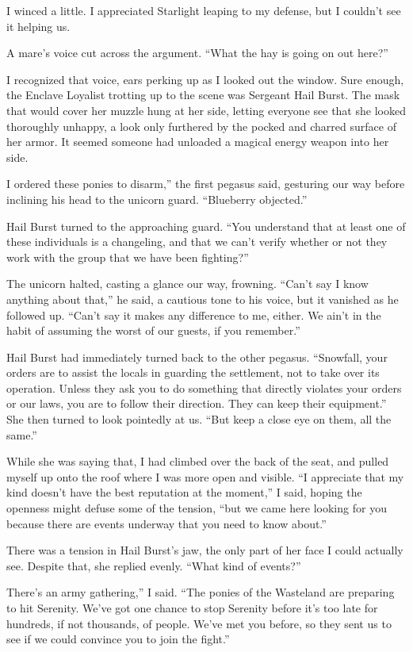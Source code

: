 I winced a little. I appreciated Starlight leaping to my defense, but I couldn’t see it helping us.

A mare’s voice cut across the argument. “What the hay is going on out here?”

I recognized that voice, ears perking up as I looked out the window. Sure enough, the Enclave Loyalist trotting up to the scene was Sergeant Hail Burst. The mask that would cover her muzzle hung at her side, letting everyone see that she looked thoroughly unhappy, a look only furthered by the pocked and charred surface of her armor. It seemed someone had unloaded a magical energy weapon into her side.

\leavevmode{}I ordered these ponies to disarm,” the first pegasus said, gesturing our way before inclining his head to the unicorn guard. “Blueberry objected.”

Hail Burst turned to the approaching guard. “You understand that at least one of these individuals is a changeling, and that we can’t verify whether or not they work with the group that we have been fighting?”

The unicorn halted, casting a glance our way, frowning. “Can’t say I know anything about that,” he said, a cautious tone to his voice, but it vanished as he followed up. “Can’t say it makes any difference to me, either. We ain’t in the habit of assuming the worst of our guests, if you remember.”

Hail Burst had immediately turned back to the other pegasus. “Snowfall, your orders are to assist the locals in guarding the settlement, not to take over its operation. Unless they ask you to do something that directly violates your orders or our laws, you are to follow their direction. They can keep their equipment.” She then turned to look pointedly at us. “But keep a close eye on them, all the same.”

While she was saying that, I had climbed over the back of the seat, and pulled myself up onto the roof where I was more open and visible. “I appreciate that my kind doesn’t have the best reputation at the moment,” I said, hoping the openness might defuse some of the tension, “but we came here looking for you because there are events underway that you need to know about.”

There was a tension in Hail Burst’s jaw, the only part of her face I could actually see. Despite that, she replied evenly. “What kind of events?”

\leavevmode{}There’s an army gathering,” I said. “The ponies of the Wasteland are preparing to hit Serenity. We’ve got one chance to stop Serenity before it’s too late for hundreds, if not thousands, of people. We’ve met you before, so they sent us to see if we could convince you to join the fight.”

